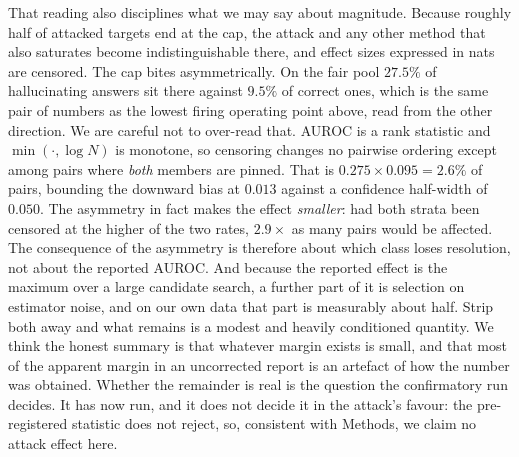 That reading also disciplines what we may say about magnitude. Because roughly half of
attacked targets end at the cap, the attack and any other method that also saturates become
indistinguishable there, and effect sizes expressed in nats are censored. The cap bites
asymmetrically. On the fair pool $27.5\%$ of hallucinating answers sit there against $9.5\%$
of correct ones, which is the same pair of numbers as the lowest firing operating point
above, read from the other direction. We are careful not to over-read that. AUROC is a rank statistic and
$\min(\cdot,\log N)$ is monotone, so censoring changes no pairwise ordering except among
pairs where \emph{both} members are pinned. That is $0.275 \times 0.095 = 2.6\%$ of pairs,
bounding the downward bias at $0.013$ against a confidence half-width of $0.050$. The
asymmetry in fact makes the effect \emph{smaller}: had both strata been censored at the
higher of the two rates, $2.9\times$ as many pairs would be affected. The consequence of the asymmetry is therefore about which
class loses resolution, not about the reported AUROC. And because the
reported effect is the maximum over a large candidate search, a further part of it is
selection on estimator noise, and on our own data that part is measurably about half.
Strip both away and
what remains is a modest and heavily conditioned quantity. We think the honest summary is
that whatever margin exists is small, and that most of the apparent margin in an uncorrected
report is an artefact of how the number was obtained. Whether the remainder is real is the
question the confirmatory run decides. It has now run, and it does not decide it in the
attack's favour: the pre-registered statistic does not reject, so, consistent with Methods,
we claim no attack effect here.

